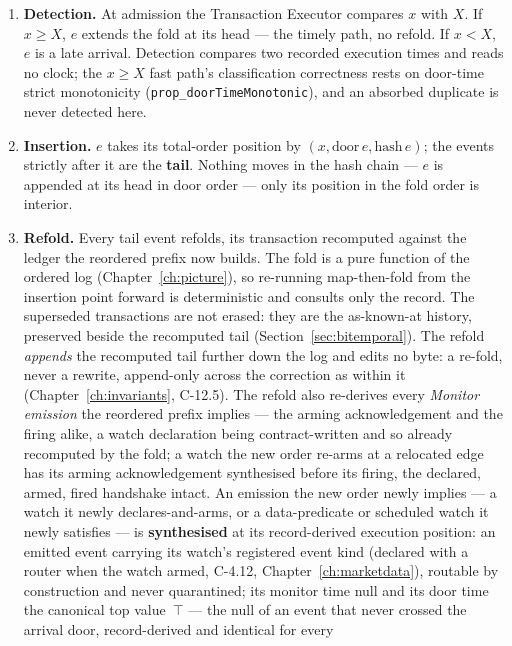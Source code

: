 \documentclass[11pt,a4paper]{article}
\begin{document}
\begin{enumerate}[label=(\alph*),leftmargin=2.2em,itemsep=2pt]
\item \textbf{Detection.} At admission the Transaction Executor compares $x$ with $X$. If
  $x\ge X$, $e$ extends the fold at its head --- the timely path, no refold. If $x<X$, $e$ is
  a late arrival. Detection compares two recorded execution times and reads no clock; the
  $x\ge X$ fast path's classification correctness rests on door-time strict monotonicity
  (\texttt{prop\_doorTimeMonotonic}), and an absorbed duplicate is never detected here.
\item \textbf{Insertion.} $e$ takes its total-order position by $(x,\mathrm{door}\,e,
  \mathrm{hash}\,e)$; the events strictly after it are the \textbf{tail}. Nothing moves in the
  hash chain --- $e$ is appended at its head in door order --- only its position in the fold
  order is interior.
\item \textbf{Refold.} Every tail event refolds, its transaction recomputed against the ledger
  the reordered prefix now builds. The fold is a pure function of the ordered log
  (Chapter~\ref{ch:picture}), so re-running map-then-fold from the insertion point forward is
  deterministic and consults only the record. The superseded transactions are not erased: they
  are the as-known-at history, preserved beside the recomputed tail (Section~\ref{sec:bitemporal}).
  The refold \emph{appends} the recomputed tail further down the log and edits no byte: a
  re-fold, never a rewrite, append-only across the correction as within it
  (Chapter~\ref{ch:invariants}, C-12.5). The refold also re-derives every \emph{Monitor
  emission} the reordered prefix implies --- the arming acknowledgement and the firing alike, a
  watch declaration being contract-written and so already recomputed by the fold; a watch the
  new order re-arms at a relocated edge has its arming acknowledgement synthesised before its
  firing, the declared, armed, fired handshake intact. An emission
  the new order newly implies --- a watch it newly declares-and-arms, or a data-predicate or
  scheduled watch it newly satisfies --- is \textbf{synthesised} at its record-derived execution
  position: an emitted event carrying its watch's registered event kind (declared with a router
  when the watch armed, C-4.12, Chapter~\ref{ch:marketdata}), routable by construction and never
  quarantined; its monitor time null and its door time the canonical top value~$\top$ --- the
  null of an event that never crossed the arrival door, record-derived and identical for every

\end{enumerate}
\end{document}

